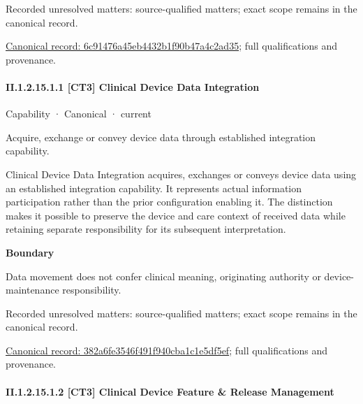{\small Recorded unresolved matters: source-qualified matters; exact scope remains in the canonical record.}\par
{\footnotesize \href{../../../../continuum/strategy/capability/6c91476a45eb4432b1f90b47a4c2ad35.md}{Canonical record: 6c91476a45eb4432b1f90b47a4c2ad35}; full qualifications and provenance.}\par
\paragraph*{II.1.2.15.1.1 [CT3] Clinical Device Data Integration}
\label{navigation:II.1.2.15.1.1}

\label{element:382a6fe3546f491f940cba1c1e5df5ef}
{\small Capability · Canonical · current}\par

Acquire, exchange or convey device data through established integration capability.



Clinical Device Data Integration acquires, exchanges or conveys device data using an established integration capability. It represents actual information participation rather than the prior configuration enabling it. The distinction makes it possible to preserve the device and care context of received data while retaining separate responsibility for its subsequent interpretation.



\textbf{Boundary}



Data movement does not confer clinical meaning, originating authority or device-maintenance responsibility.


{\small Recorded unresolved matters: source-qualified matters; exact scope remains in the canonical record.}\par
{\footnotesize \href{../../../../continuum/strategy/capability/382a6fe3546f491f940cba1c1e5df5ef.md}{Canonical record: 382a6fe3546f491f940cba1c1e5df5ef}; full qualifications and provenance.}\par
\paragraph*{II.1.2.15.1.2 [CT3] Clinical Device Feature \& Release Management}
\label{navigation:II.1.2.15.1.2}

